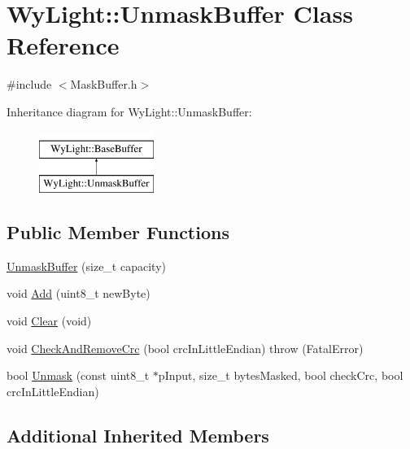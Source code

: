 \hypertarget{class_wy_light_1_1_unmask_buffer}{\section{Wy\-Light\-:\-:Unmask\-Buffer Class Reference}
\label{class_wy_light_1_1_unmask_buffer}
}


{\ttfamily \#include $<$Mask\-Buffer.\-h$>$}

Inheritance diagram for Wy\-Light\-:\-:Unmask\-Buffer\-:\begin{figure}[H]
\begin{center}
\leavevmode
\includegraphics[height=2.000000cm]{class_wy_light_1_1_unmask_buffer}
\end{center}
\end{figure}
\subsection*{Public Member Functions}
\begin{DoxyCompactItemize}
\item 
\hyperlink{class_wy_light_1_1_unmask_buffer_a664016ab8306b9c72c01a8d57b2404b5}{Unmask\-Buffer} (size\-\_\-t capacity)
\item 
void \hyperlink{class_wy_light_1_1_unmask_buffer_a176ee14660b44137a8ce041c7e338b94}{Add} (uint8\-\_\-t new\-Byte)
\item 
void \hyperlink{class_wy_light_1_1_unmask_buffer_a0d535dd72bf7759dc780e1341f30a75f}{Clear} (void)
\item 
void \hyperlink{class_wy_light_1_1_unmask_buffer_a4ce5f97f46916275ddb5f919483acab6}{Check\-And\-Remove\-Crc} (bool crc\-In\-Little\-Endian)  throw (\-Fatal\-Error)
\item 
bool \hyperlink{class_wy_light_1_1_unmask_buffer_a8268033300f5f43ad9ccb2e806b84b44}{Unmask} (const uint8\-\_\-t $\ast$p\-Input, size\-\_\-t bytes\-Masked, bool check\-Crc, bool crc\-In\-Little\-Endian)
\end{DoxyCompactItemize}
\subsection*{Additional Inherited Members}


